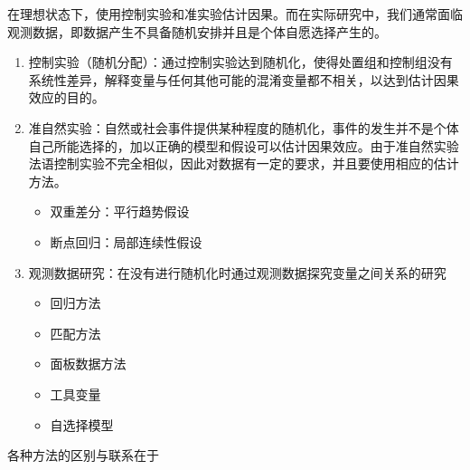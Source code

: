 \documentclass[11pt,a4paper]{ctexart}
\begin{document}
在理想状态下，使用控制实验和准实验估计因果。而在实际研究中，我们通常面临观测数据，即数据产生不具备随机安排并且是个体自愿选择产生的。

\begin{enumerate}
\def\labelenumi{\arabic{enumi}.}
\item
  控制实验（随机分配）：通过控制实验达到随机化，使得处置组和控制组没有系统性差异，解释变量与任何其他可能的混淆变量都不相关，以达到估计因果效应的目的。
\item
  准自然实验：自然或社会事件提供某种程度的随机化，事件的发生并不是个体自己所能选择的，加以正确的模型和假设可以估计因果效应。由于准自然实验法语控制实验不完全相似，因此对数据有一定的要求，并且要使用相应的估计方法。

  \begin{itemize}
  \item
    双重差分：平行趋势假设
  \item
    断点回归：局部连续性假设
  \end{itemize}
\item
  观测数据研究：在没有进行随机化时通过观测数据探究变量之间关系的研究

  \begin{itemize}
  \item
    回归方法
  \item
    匹配方法
  \item
    面板数据方法
  \item
    工具变量
  \item
    自选择模型
  \end{itemize}
\end{enumerate}

各种方法的区别与联系在于
\end{document}
